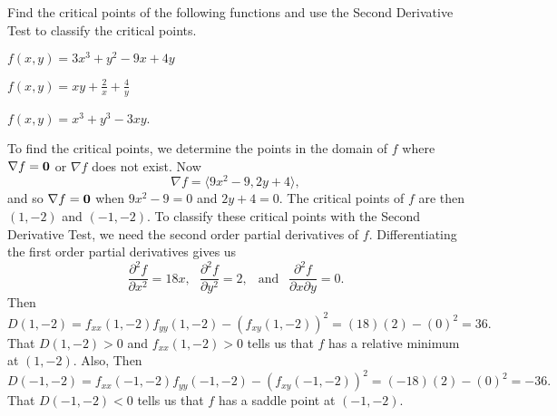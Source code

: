 \begin{activity} \label{A:10.7.5} Find the critical points of the
  following functions and use the Second Derivative Test to classify
  the critical points.  
  \ba
\item $f(x,y) = 3x^3+y^2-9x+4y$
\item $f(x,y) = xy + \frac{2}{x} + \frac{4}{y}$
\item $f(x,y) = x^3 + y^3 - 3xy$.
  \ea
\end{activity}
\begin{smallhint}

\end{smallhint}
\begin{bighint}

\end{bighint}
\begin{activitySolution}
\ba
\item To find the critical points, we determine the points in the domain of $f$ where $\nabla f = \mathbf{0}$ or $\nabla f$ does not exist. Now
\[\nabla f = \langle 9x^2-9, 2y+4 \rangle,\]
and so $\nabla f = \mathbf{0}$ when $9x^2-9 = 0$ and $2y+4 = 0$. The critical points of $f$ are then $(1,-2)$ and $(-1,-2)$. To classify these critical points with the Second Derivative Test, we need the second order partial derivatives of $f$. Differentiating the first order partial derivatives gives us
\[\frac{\partial^2 f}{\partial x^2} = 18x, \ \ \ \frac{\partial^2 f}{\partial y^2} = 2, \ \ \text{ and } \ \ \frac{\partial^2 f}{\partial x \partial y} = 0.\]
Then
\[D(1,-2) = f_{xx}(1,-2)f_{yy}(1,-2) - \left(f_{xy}(1,-2)\right)^2 = (18)(2) - (0)^2 = 36.\]
That $D(1,-2) > 0$ and $f_{xx}(1,-2) > 0$ tells us that $f$ has a relative minimum at $(1,-2)$. Also,
Then
\[D(-1,-2) = f_{xx}(-1,-2)f_{yy}(-1,-2) - \left(f_{xy}(-1,-2)\right)^2 = (-18)(2) - (0)^2 = -36.\]
That $D(-1,-2) < 0$ tells us that $f$ has a saddle point at $(-1,-2)$.


\end{activitySolution}
